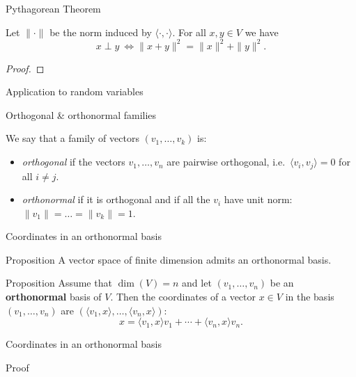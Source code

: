 \documentclass{beamer}
\begin{document}
\begin{frame}{Pythagorean Theorem}
	\grid

	\vspace{-0.4cm}
	\begin{theorem}
		Let $\| \cdot \|$ be the norm induced by $\langle \cdot, \cdot \rangle$.
		For all $x,y \in V$ we have
		$$
		x \perp y \ \Longleftrightarrow \|x+y\|^2 = \|x\|^2 + \|y\|^2.
		$$
	\end{theorem}
	\begin{proof}
		\vfill
		\vspace{4cm}
	\end{proof}
\end{frame}

\begin{frame}[t]{Application to random variables}
	\grid

\end{frame}

\begin{frame}[t]{Orthogonal \& orthonormal families}
	\grid

	\vspace{-0.4cm}
	\begin{definition}
		We say that a family of vectors $(v_1, \dots, v_k)$ is:
		\begin{itemize}
			\item \emph{orthogonal} if the vectors $v_1, \dots, v_n$ are pairwise orthogonal, i.e.\ $\langle v_i, v_j \rangle = 0$ for all $i \neq j$.
			\item \emph{orthonormal} if it is orthogonal and if all the $v_i$ have unit norm: $\|v_1\| = \dots = \|v_k\| = 1$.
		\end{itemize}
	\end{definition}
\end{frame}

\begin{frame}[t]{Coordinates in an orthonormal basis}
	\grid

	\vspace{-0.4cm}
	\begin{block}{Proposition}
		A vector space of finite dimension admits an orthonormal basis.
	\end{block}
	\begin{block}{Proposition}
		Assume that $\dim(V)=n$ and let $(v_1, \dots, v_n)$ be an \textbf{orthonormal} basis of $V$. Then the coordinates of a vector $x \in V$ in the basis $(v_1, \dots, v_n)$ are $(\langle v_1, x\rangle, \dots, \langle v_n,x \rangle)$:
		$$
		x = \langle v_1, x \rangle v_1 + \cdots + \langle v_n, x \rangle v_n.
		$$
	\end{block}

\end{frame}
\begin{frame}[t]{Coordinates in an orthonormal basis}
	\grid

\end{frame}
\begin{frame}[t]{Proof}
	\grid

\end{frame}
\end{document}
